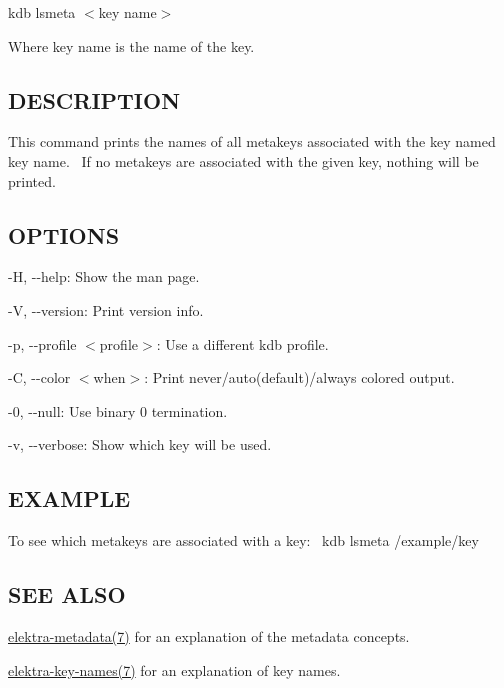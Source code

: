 {\ttfamily kdb lsmeta $<$key name$>$}

Where {\ttfamily key name} is the name of the key.

\subsection*{D\+E\+S\+C\+R\+I\+P\+T\+I\+ON}

This command prints the names of all metakeys associated with the key named {\ttfamily key name}.~\newline
 If no metakeys are associated with the given key, nothing will be printed.~\newline


\subsection*{O\+P\+T\+I\+O\+NS}


\begin{DoxyItemize}
\item {\ttfamily -\/H}, {\ttfamily -\/-\/help}\+: Show the man page.
\item {\ttfamily -\/V}, {\ttfamily -\/-\/version}\+: Print version info.
\item {\ttfamily -\/p}, {\ttfamily -\/-\/profile $<$profile$>$}\+: Use a different kdb profile.
\item {\ttfamily -\/C}, {\ttfamily -\/-\/color $<$when$>$}\+: Print never/auto(default)/always colored output.
\item {\ttfamily -\/0}, {\ttfamily -\/-\/null}\+: Use binary 0 termination.
\item {\ttfamily -\/v}, {\ttfamily -\/-\/verbose}\+: Show which key will be used.
\end{DoxyItemize}

\subsection*{E\+X\+A\+M\+P\+LE}

To see which metakeys are associated with a key\+:~\newline
 {\ttfamily kdb lsmeta /example/key}

\subsection*{S\+EE A\+L\+SO}


\begin{DoxyItemize}
\item \hyperlink{md_doc_help_elektra-metadata_doc_help_elektra-metadata_md}{elektra-\/metadata(7)} for an explanation of the metadata concepts.
\item \hyperlink{md_doc_help_elektra-key-names_doc_help_elektra-key-names_md}{elektra-\/key-\/names(7)} for an explanation of key names. 
\end{DoxyItemize}